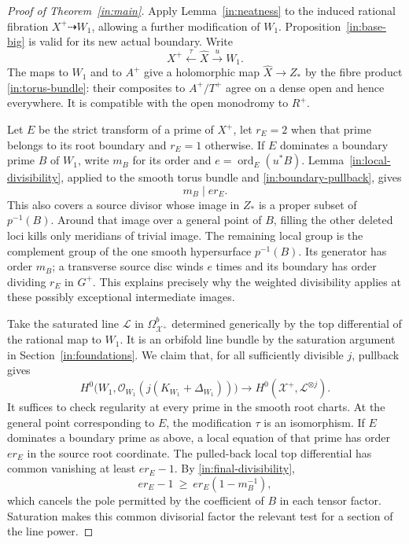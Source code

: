 \begin{proof}[Proof of Theorem~\ref{in:main}]
Apply Lemma~\ref{in:neatness} to the induced rational fibration
$X^+\dashrightarrow W_1$, allowing a further modification of $W_1$.
Proposition~\ref{in:base-big} is valid for its new actual boundary.
Write
\[
 X^+\xleftarrow{\tau}\widehat X\overset{u}{\longrightarrow}W_1.
\]
The maps to $W_1$ and to $A^+$ give a holomorphic map
$\widehat X\to Z_*$ by the fibre product
\eqref{in:torus-bundle}: their composites to $A^+/T^+$ agree on a
dense open and hence everywhere.  It is compatible with the open
monodromy to $R^+$.

Let $E$ be the strict transform of a prime of $X^+$, let $r_E=2$
when that prime belongs to its root boundary and $r_E=1$ otherwise.
If $E$ dominates a boundary prime $B$ of $W_1$, write $m_B$ for
its order and $e=\operatorname{ord}_E(u^*B)$.  Lemma~\ref{in:local-divisibility},
applied to the smooth torus bundle and
\eqref{in:boundary-pullback}, gives
\begin{equation}\label{in:final-divisibility}
 m_B\mid e r_E.
\end{equation}
This also covers a source divisor whose image in $Z_*$ is a proper
subset of $p^{-1}(B)$.  Around that image over a general point of
$B$, filling the other deleted loci kills only meridians of trivial
image.  The remaining local group is the complement group of the
one smooth hypersurface $p^{-1}(B)$.  Its generator has order $m_B$;
a transverse source disc winds $e$ times and its boundary has order
dividing $r_E$ in $G^+$.  This explains precisely why the weighted
divisibility applies at these possibly exceptional intermediate
images.

Take the saturated line $\mathcal L$ in
$\Omega^b_{\mathcal X^+}$ determined generically by the top
differential of the rational map to $W_1$.  It is an orbifold line
bundle by the saturation argument in Section~\ref{in:foundations}.
We claim that, for all sufficiently divisible $j$, pullback gives
\begin{equation}\label{in:final-sections}
 H^0\bigl(W_1,\mathcal O_{W_1}(j(K_{W_1}+\Delta_{W_1}))\bigr)
 \longrightarrow H^0(\mathcal X^+,\mathcal L^{\otimes j}).
\end{equation}
It suffices to check regularity at every prime in the smooth root
charts.  At the general point corresponding to $E$, the modification
$\tau$ is an isomorphism.  If $E$ dominates a boundary prime as
above, a local equation of that prime has order $e r_E$ in the
source root coordinate.  The pulled-back local top differential has
common vanishing at least $e r_E-1$.  By
\eqref{in:final-divisibility},
\[
 e r_E-1\ \ge\ e r_E(1-m_B^{-1}),
\]
which cancels the pole permitted by the coefficient of $B$ in each
tensor factor.  Saturation makes this common divisorial factor the
relevant test for a section of the line power.


\end{proof}
